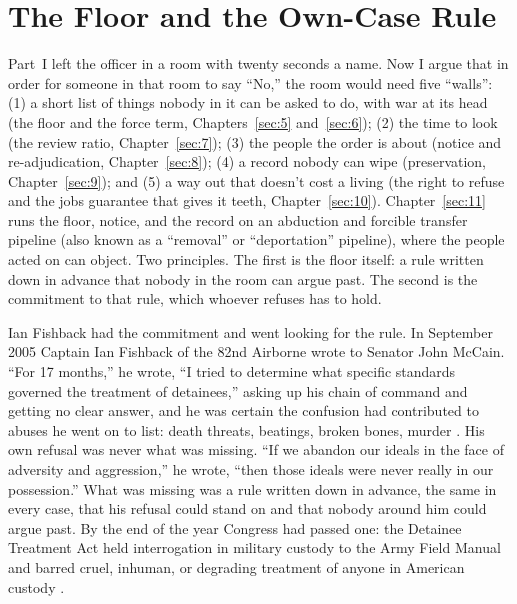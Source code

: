 \chapter{The Floor and the Own-Case Rule}
\label{sec:4}
Part~I left the officer in a room with twenty seconds a name. Now I argue that in order for someone in that room to say “No,” the room would need five “walls”: (1) a short list of things nobody in it can be asked to do, with war at its head (the floor and the force term, Chapters~\ref{sec:5} and~\ref{sec:6}); (2) the time to look (the review ratio, Chapter~\ref{sec:7}); (3) the people the order is about (notice and re-adjudication, Chapter~\ref{sec:8}); (4) a record nobody can wipe (preservation, Chapter~\ref{sec:9}); and (5) a way out that doesn't cost a living (the right to refuse and the jobs guarantee that gives it teeth, Chapter~\ref{sec:10}). Chapter~\ref{sec:11} runs the floor, notice, and the record on an abduction and forcible transfer pipeline (also known as a “removal” or “deportation” pipeline), where the people acted on can object. Two principles. The first is the floor itself: a rule written down in advance that nobody in the room can argue past. The second is the commitment to that rule, which whoever refuses has to hold.

Ian Fishback had the commitment and went looking for the rule. In September 2005 Captain Ian Fishback of the 82nd Airborne wrote to Senator John McCain. “For 17 months,” he wrote, “I tried to determine what specific standards governed the treatment of detainees,” asking up his chain of command and getting no clear answer, and he was certain the confusion had contributed to abuses he went on to list: death threats, beatings, broken bones, murder \autocite{fishback2005honor}. His own refusal was never what was missing. “If we abandon our ideals in the face of adversity and aggression,” he wrote, “then those ideals were never really in our possession.” What was missing was a rule written down in advance, the same in every case, that his refusal could stand on and that nobody around him could argue past. By the end of the year Congress had passed one: the Detainee Treatment Act held interrogation in military custody to the Army Field Manual and barred cruel, inhuman, or degrading treatment of anyone in American custody \autocite{dta2005}.

